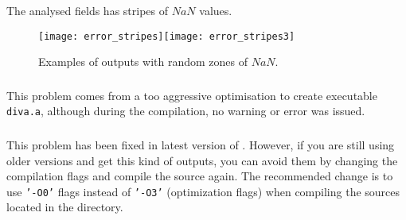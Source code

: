 The analysed fields has stripes of $NaN$ values.

\begin{figure}[htpb]
\centering
\texttt{[image: error\_stripes]}\texttt{[image: error\_stripes3]}
\caption{Examples of \diva outputs with random zones of $NaN$.\label{fig:error_stripes}}
\end{figure}

\subsubsection{\question}

This problem comes from a too aggressive optimisation to create executable \texttt{diva.a}, although during the compilation, no warning or error was issued.  

\subsubsection{\answer}

This problem has been fixed in latest version of \diva. However, if you are still using older versions and get this kind of outputs, you can avoid them by changing the compilation flags and compile the source again. The recommended change is to use \texttt{'-O0'} flags instead of \texttt{'-O3'} (optimization flags) when compiling the sources located in the  directory.

